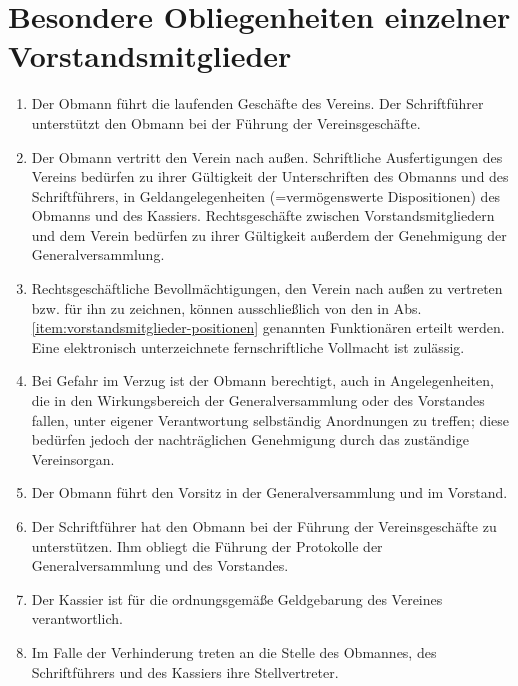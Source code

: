 \documentclass[a4paper,12pt]{article}
\newcommand{\comment}[1]{{\newline \bf /*Kommentar:} #1 {\bf Ende Kommentar*/}}
\def\comment#1{}
\begin{document}
\section{Besondere Obliegenheiten einzelner Vorstandsmitglieder} %
\label{sec:Vorstandsmitglieder}
\begin{enumerate}
\item Der Obmann führt die laufenden Geschäfte des Vereins. Der Schriftführer unterstützt den Obmann bei der Führung der Vereinsgeschäfte.
\item\label{item:vorstandsmitglieder-positionen} Der Obmann vertritt den Verein nach außen. Schriftliche Ausfertigungen des Vereins bedürfen zu ihrer Gültigkeit der Unterschriften des Obmanns und des Schriftführers, in Geldangelegenheiten (=vermögenswerte Dispositionen) des Obmanns und des Kassiers. Rechtsgeschäfte zwischen Vorstandsmitgliedern und dem Verein bedürfen zu ihrer Gültigkeit außerdem der Genehmigung der Generalversammlung.
\comment{es gilt insbesondere der § 24 Abs 2 und 3 VerG 2002}
\item Rechtsgeschäftliche Bevollmächtigungen, den Verein nach außen zu vertreten bzw. für ihn zu zeichnen, können ausschließlich von den in Abs. \ref{item:vorstandsmitglieder-positionen} genannten Funktionären erteilt werden. Eine elektronisch unterzeichnete fernschriftliche Vollmacht ist zulässig.
\item Bei Gefahr im Verzug ist der Obmann berechtigt, auch in Angelegenheiten, die in den Wirkungsbereich der Generalversammlung oder des Vorstandes fallen, unter eigener Verantwortung selbständig Anordnungen zu treffen; diese bedürfen jedoch der nachträglichen Genehmigung durch das zuständige Vereinsorgan.
\item Der Obmann führt den Vorsitz in der Generalversammlung und im Vorstand.
\item Der Schriftführer hat den Obmann bei der Führung der Vereinsgeschäfte zu unterstützen. Ihm obliegt die Führung der Protokolle der Generalversammlung und des Vorstandes.
\item Der Kassier ist für die ordnungsgemäße Geldgebarung des Vereines verantwortlich.
\item Im Falle der Verhinderung treten an die Stelle des Obmannes, des Schriftführers und des Kassiers ihre Stellvertreter.
\end{enumerate}
\end{document}
